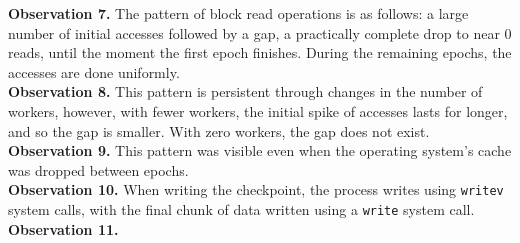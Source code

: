 \documentclass[conference]{IEEEtran}
\begin{document}
\textbf{Observation 7.} The pattern of block read operations is as follows: a large number of initial accesses followed by a gap, a practically complete drop to near 0 reads,  until the moment the first epoch finishes. During the remaining epochs, the accesses are done uniformly. 
\\
\textbf{Observation 8.} This pattern is persistent through changes in the number of workers, however, with fewer workers, the initial spike of accesses lasts for longer, and so the gap is smaller. With zero workers, the gap does not exist. 
\\
\textbf{Observation 9.} This pattern was visible even when the operating system's cache was dropped between epochs.
\\
\textbf{Observation 10.} When writing the checkpoint, the process writes using \texttt{writev} system calls, with the final chunk of data written using a \texttt{write} system call.
\\
\textbf{Observation 11.} 


\end{document}
